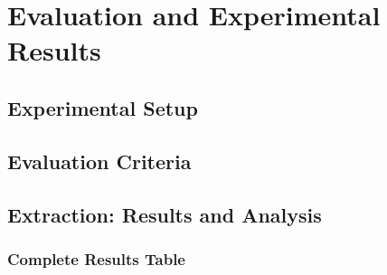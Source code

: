 \chapter[Chapter 4]{Evaluation and Experimental Results}
\label{chap:evaluation_experimental_results}

\section{Experimental Setup}
\label{sec:experimental_setup}



\section{Evaluation Criteria}
\label{sec:evaluation_criteria}

\section{Extraction: Results and Analysis}
\label{sec:results_analysis}

\subsection{Complete Results Table}
\label{subsec:extraction_results_table}

